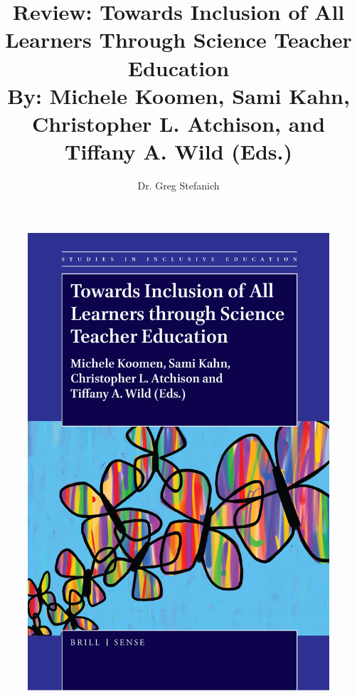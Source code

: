 \documentclass[11.5pt]{sig-alternate} %
\begin{document}
\title{Review:
Towards Inclusion of All Learners Through Science Teacher Education\\
By: Michele Koomen, Sami Kahn, Christopher L. Atchison, and Tiffany A. Wild (Eds.)}

\author[1]{\large \color{blue}Dr. Greg Stefanich}


\toappear{}
\maketitle
\begin{@twocolumnfalse}

\begin{figure}[ht]
\centering
    \includegraphics[width=0.7\linewidth]{fig1.jpg}
\end{figure}
\end{@twocolumnfalse}
\end{document}
